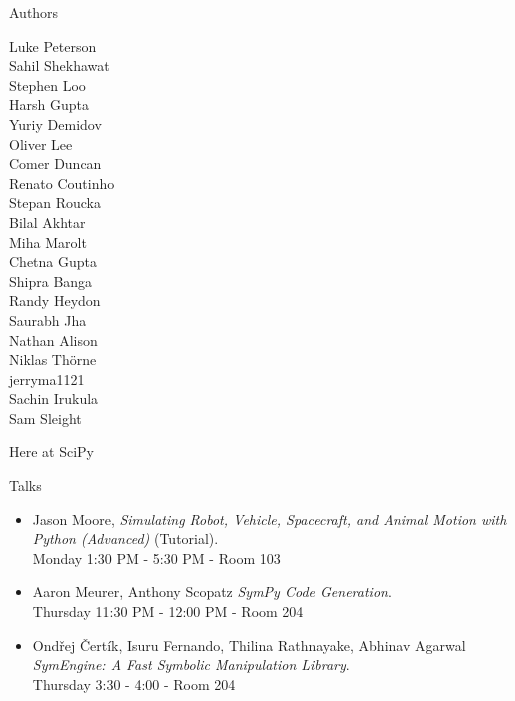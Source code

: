 \documentclass[xcolor=svgnames]{beamer}
\begin{document}
\begin{frame}{Authors}
\begin{multicols}{5}
        Luke Peterson\\
        Sahil Shekhawat\\
        Stephen Loo\\
        Harsh Gupta\\
        Yuriy Demidov\\
        Oliver Lee\\
        Comer Duncan\\
        Renato Coutinho\\
        Stepan Roucka\\
        Bilal Akhtar\\
        Miha Marolt\\
        Chetna Gupta\\
        Shipra Banga\\
        Randy Heydon\\
        Saurabh Jha\\
        Nathan Alison\\
        Niklas Thörne\\
        jerryma1121\\
        Sachin Irukula\\
        Sam Sleight\\
  \end{multicols}
\end{frame}


\begin{frame}{Here at SciPy}
  \begin{block}{Talks}
    \begin{itemize}
    \item \normalsize Jason Moore, \textit{Simulating Robot, Vehicle, Spacecraft, and Animal Motion with Python (Advanced)}
      (Tutorial). \\ \footnotesize Monday 1:30 PM - 5:30 PM - Room 103
    \item \normalsize Aaron Meurer, Anthony Scopatz \textit{SymPy Code Generation}. \\ \footnotesize Thursday 11:30
      PM - 12:00 PM - Room 204
    \item \normalsize Ondřej Čertík, Isuru Fernando, Thilina Rathnayake, Abhinav Agarwal \textit{SymEngine: A Fast Symbolic Manipulation Library}. \\ \footnotesize Thursday 3:30
      - 4:00 - Room 204
    \end{itemize}
  \end{block}
\end{frame}
\end{document}
